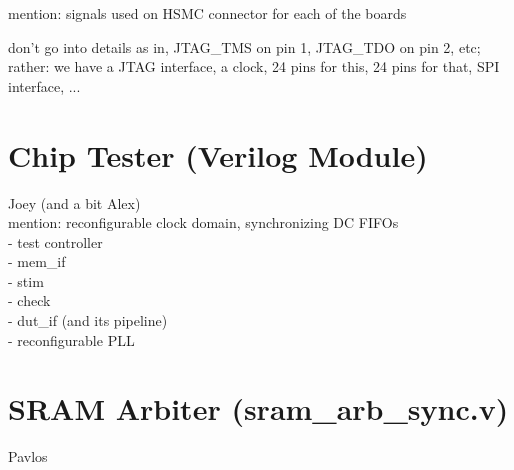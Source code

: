 mention: signals used on HSMC connector for each of the boards

don't go into details as in, JTAG\_TMS on pin 1, JTAG\_TDO on pin 2,
etc; rather: we have a JTAG interface, a clock, 24 pins for this, 24
pins for that, SPI interface, ...


\section{Chip Tester (Verilog Module)}
Joey  (and a bit Alex) \\
   mention: reconfigurable clock domain, synchronizing DC FIFOs \\
   - test controller \\
     - mem\_if \\
     - stim \\
     - check \\
   - dut\_if (and its pipeline) \\
   - reconfigurable PLL \\


\section{SRAM Arbiter (sram\_arb\_sync.v)}
Pavlos